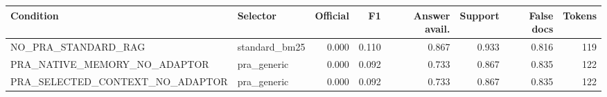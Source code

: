 \begin{tabular}{llrrrrrr}
\toprule
Condition & Selector & Official & F1 & Answer avail. & Support & False docs & Tokens \\
\midrule
NO\_PRA\_STANDARD\_RAG & standard\_bm25 & 0.000 & 0.110 & 0.867 & 0.933 & 0.816 & 119 \\
PRA\_NATIVE\_MEMORY\_NO\_ADAPTOR & pra\_generic & 0.000 & 0.092 & 0.733 & 0.867 & 0.835 & 122 \\
PRA\_SELECTED\_CONTEXT\_NO\_ADAPTOR & pra\_generic & 0.000 & 0.092 & 0.733 & 0.867 & 0.835 & 122 \\
\bottomrule
\end{tabular}
